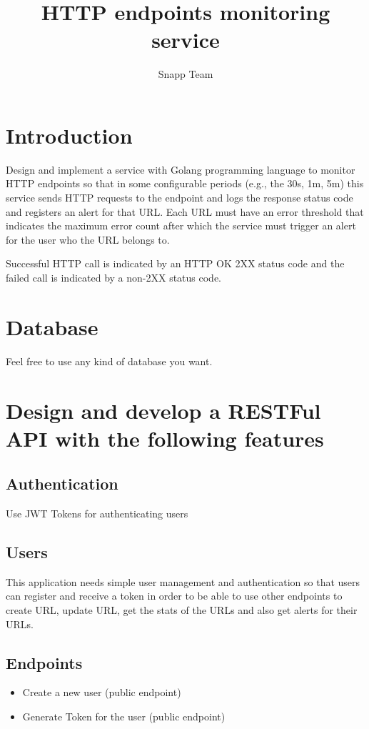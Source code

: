 \documentclass{article}
\begin{document}
\title{HTTP endpoints monitoring service}
\author{Snapp Team}

\maketitle
\tableofcontents

\section{Introduction}
Design and implement a service with Golang programming language to monitor HTTP endpoints so that in some configurable periods (e.g., the 30s, 1m, 5m) this service sends HTTP requests to the endpoint and logs the response status code and registers an alert for that URL. Each URL must have an error threshold that indicates the maximum error count after which the service must trigger an alert for the user who the URL belongs to.

Successful HTTP call is indicated by an HTTP OK 2XX status code and the failed call is indicated by a non-2XX status code.


\section{Database}

Feel free to use any kind of database you want.



\section{Design and develop a RESTFul API with the following features}
\subsection{Authentication}
Use JWT Tokens for authenticating users

\subsection{Users}
This application needs simple user management and authentication so that users can register and receive a token in order to be able to use other endpoints to create URL, update URL, get the stats of the URLs and also get alerts for their URLs.

\subsection{Endpoints}
\begin{itemize}
  \item Create a new user (public endpoint)
  \item Generate Token for the user (public endpoint)
\end{itemize}
\end{document}
